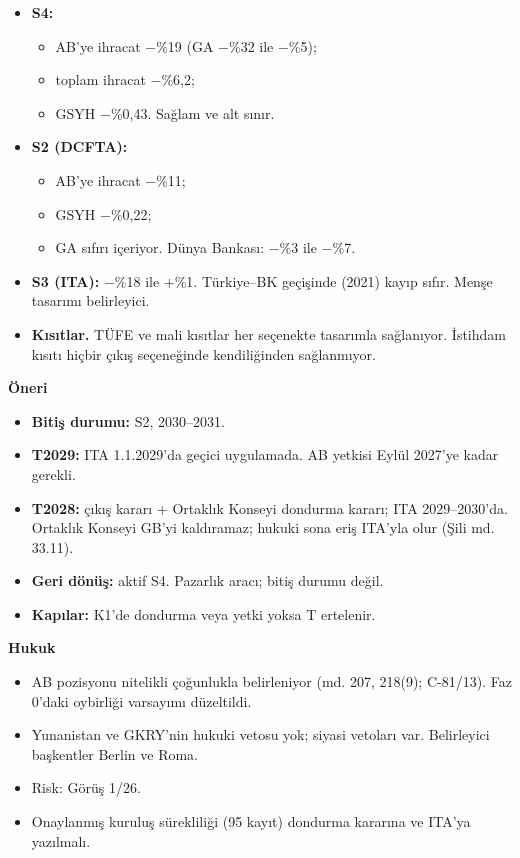\begin{itemize}
\tightlist
\item
  \textbf{S4:}

  \begin{itemize}
  \tightlist
  \item
    AB'ye ihracat −\%19 (GA −\%32 ile −\%5);
  \item
    toplam ihracat −\%6,2;
  \item
    GSYH −\%0,43. Sağlam ve alt sınır.
  \end{itemize}
\item
  \textbf{S2 (DCFTA):}

  \begin{itemize}
  \tightlist
  \item
    AB'ye ihracat −\%11;
  \item
    GSYH −\%0,22;
  \item
    GA sıfırı içeriyor. Dünya Bankası: −\%3 ile −\%7.
  \end{itemize}
\item
  \textbf{S3 (ITA):} −\%18 ile +\%1. Türkiye--BK geçişinde (2021) kayıp sıfır. Menşe tasarımı belirleyici.
\item
  \textbf{Kısıtlar.} TÜFE ve mali kısıtlar her seçenekte tasarımla sağlanıyor. İstihdam kısıtı hiçbir çıkış seçeneğinde kendiliğinden sağlanmıyor.
\end{itemize}

\textbf{Öneri \etiketH{}}

\begin{itemize}
\tightlist
\item
  \textbf{Bitiş durumu:} S2, 2030--2031.
\item
  \textbf{T2029:} ITA 1.1.2029'da geçici uygulamada. AB yetkisi Eylül 2027'ye kadar gerekli.
\item
  \textbf{T2028:} çıkış kararı + Ortaklık Konseyi dondurma kararı; ITA 2029--2030'da. Ortaklık Konseyi GB'yi kaldıramaz; hukuki sona eriş ITA'yla olur (Şili md. 33.11).
\item
  \textbf{Geri dönüş:} aktif S4. Pazarlık aracı; bitiş durumu değil.
\item
  \textbf{Kapılar:} K1'de dondurma veya yetki yoksa T ertelenir.
\end{itemize}

\textbf{Hukuk}

\begin{itemize}
\tightlist
\item
  AB pozisyonu nitelikli çoğunlukla belirleniyor (md. 207, 218(9); C-81/13). Faz 0'daki oybirliği varsayımı düzeltildi.
\item
  Yunanistan ve GKRY'nin hukuki vetosu yok; siyasi vetoları var. Belirleyici başkentler Berlin ve Roma.
\item
  Risk: Görüş 1/26.
\item
  Onaylanmış kuruluş sürekliliği (95 kayıt) dondurma kararına ve ITA'ya yazılmalı.
\end{itemize}

